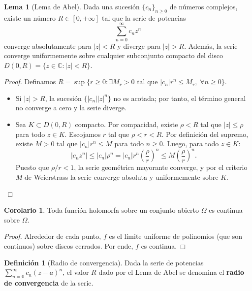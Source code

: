 \documentclass[11pt,a4paper]{article}
\theoremstyle{definition}
\newtheorem{definicion}{Definición}[section]
\newtheorem{lema}{Lema}[section]
\newtheorem{corolario}{Corolario}[section]
\theoremstyle{remark}
\numberwithin{equation}{section}
\begin{document}
\begin{lema}[Lema de Abel]
Dada una sucesión $\{c_n\}_{n \ge 0}$ de números complejos, existe un número $R \in [0, +\infty]$ tal que la serie de potencias
\begin{equation}
\sum_{n=0}^\infty c_n z^n
\end{equation}
converge absolutamente para $|z| < R$ y diverge para $|z| > R$. Además, la serie converge uniformemente sobre cualquier subconjunto compacto del disco $D(0,R) = \{z \in \mathbb{C} : |z| < R\}$.
\end{lema}
\begin{proof}
Definamos $R = \sup\{r \ge 0 : \exists M_r > 0 \text{ tal que } |c_n| r^n \le M_r, \; \forall n \ge 0\}$.
\begin{itemize}
\item Si $|z| > R$, la sucesión $\{|c_n| |z|^n\}$ no es acotada; por tanto, el término general no converge a cero y la serie diverge.
\item Sea $K \subset D(0,R)$ compacto. Por compacidad, existe $\rho < R$ tal que $|z| \le \rho$ para todo $z \in K$. Escojamos $r$ tal que $\rho < r < R$. Por definición del supremo, existe $M > 0$ tal que $|c_n| r^n \le M$ para todo $n \ge 0$. Luego, para todo $z \in K$:
\[
|c_n z^n| \le |c_n| \rho^n = |c_n| r^n \left(\frac{\rho}{r}\right)^n \le M \left(\frac{\rho}{r}\right)^n.
\]
Puesto que $\rho/r < 1$, la serie geométrica mayorante converge, y por el criterio $M$ de Weierstrass la serie converge absoluta y uniformemente sobre $K$.
\end{itemize}
\end{proof}

\begin{corolario}
Toda función holomorfa sobre un conjunto abierto $\Omega$ es continua sobre $\Omega$.
\end{corolario}
\begin{proof}
Alrededor de cada punto, $f$ es el límite uniforme de polinomios (que son continuos) sobre discos cerrados. Por ende, $f$ es continua.
\end{proof}

\begin{definicion}[Radio de convergencia]
Dada la serie de potencias $\sum_{n=0}^\infty c_n (z-a)^n$, el valor $R$ dado por el Lema de Abel se denomina el \textbf{radio de convergencia} de la serie.
\end{definicion}
\end{document}
